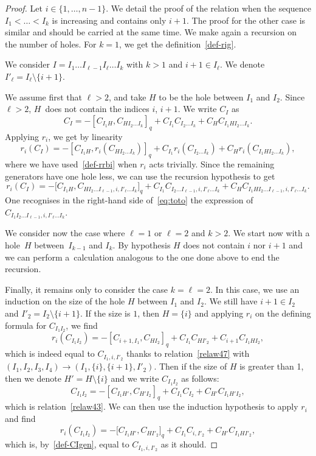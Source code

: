 \documentclass[pdftex]{sigma}
\numberwithin{equation}{section}
\theoremstyle{definition}
\begin{document}
\begin{proof}
Let $i\in\{1,\dots,n-1\}$. We detail the proof of the relation when the sequence ${I_1\!<\dots<I_{k}}$ is increasing and contains only $i+1$. The proof for the other case is similar and should be carried at the same time.
We make again a recursion on the number of holes. For $k=1$, we get the definition~\eqref{def-rig}.

We consider $I=I_1\dots I_{\ell-1} I_{\ell}\dots I_{k}$ with $k>1$ and $i+1\in I_{\ell}$. We denote $I'_{\ell}=I_{\ell}\setminus\{i+1\}$.

We assume first that $\ell>2$, and take $H$ to be the hole between $I_1$ and $I_2$. Since $\ell>2$, $H$~does not contain the indices $i$, $i+1$. We write $C_I$ as
\begin{equation*}
C_I = -[C_{I_1H} , C_{HI_{2}\dots I_{k}}]_q+
C_{I_1} C_{I_{2}\dots I_{k}}+C_{H} C_{I_1 HI_{2}\dots I_{k}}.
\end{equation*}
Applying $r_i$, we get by linearity
\begin{equation*}
r_i(C_I) = -[C_{I_1 H} , r_i(C_{HI_{2}\dots I_{k}})]_q+
C_{I_1} r_i(C_{I_{2}\dots I_{k}})+C_{H} r_i(C_{I_1 HI_{2}\dots I_{k}}),
\end{equation*}
where we have used~\eqref{def-rrbi} when $r_i$ acts trivially.
Since the remaining generators have one hole less, we can use the recursion hypothesis to get
\begin{equation}\label{eq:toto}
r_i(C_I) = -\big[C_{I_1 H} , C_{HI_{2}\dots I_{\ell-1},i,I'_{\ell}\dots I_{k}}\big]_q+
C_{I_1} C_{I_{2}\dots I_{\ell-1},i,I'_{\ell}\dots I_{k}}+C_{H} C_{I_1 HI_{2}\dots I_{\ell-1},i,I'_{\ell}\dots I_{k}}.
\end{equation}
One recognises in the right-hand side of~\eqref{eq:toto} the expression of $C_{I_1I_{2}\dots I_{\ell-1},i,I'_{\ell}\dots I_{k}}$.

We consider now the case where $\ell=1$ or $\ell=2$ and $k>2$. We start now with a hole~$H$ between~$I_{k-1}$ and $I_{k}$. By hypothesis $H$ does not contain $i$ nor $i+1$ and we can perform a~calculation analogous to the one done above to end the recursion.

Finally, it remains only to consider the case $k=\ell=2$. In this case, we use an induction on the size of the hole $H$ between $I_1$ and $I_2$. We still have $i+1\in I_2$ and $I'_2=I_2\setminus\{i+1\}$. If the size is $1$, then $H=\{i\}$ and applying $r_i$ on the defining formula for $C_{I_1I_2}$, we find
\[r_i(C_{I_1I_2}) = -[C_{i+1,I_1} , C_{HI_2}]_q+
C_{I_1} C_{HI'_2}+C_{i+1} C_{I_1 HI_{2}},\]
which is indeed equal to $C_{I_1,i,I'_2}$ thanks to relation~\eqref{relaw47} with $(I_1,I_2,I_3,I_4)\to (I_1,\{i\},{\{i+1\}},\allowbreak I'_2)$. Then if the size of $H$ is greater than 1, then we denote $H'=H\setminus\{i\}$ and we write $C_{I_1I_2}$ as follows:
\[C_{I_1I_2} = -[C_{I_1H'} , C_{H'I_2}]_q+
C_{I_1} C_{I_2}+C_{H'} C_{I_1 H'I_{2}},\]
which is relation~\eqref{relaw43}. We can then use the induction hypothesis to apply $r_i$ and find
\[r_i(C_{I_1I_2}) = -\big[C_{I_1H'} , C_{HI'_2}\big]_q+
C_{I_1} C_{i,I'_2}+C_{H'} C_{I_1 HI'_{2}},\]
which is, by~\eqref{def-CIgen}, equal to $C_{I_1,i,I'_2}$ as it should.


\end{proof}
\end{document}
